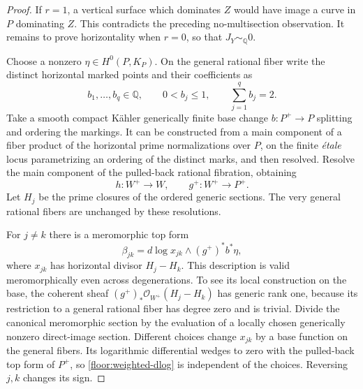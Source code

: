 \documentclass[11pt,letterpaper]{article}
\theoremstyle{definition}
\theoremstyle{remark}
\begin{document}
\begin{proof}
If $r=1$, a vertical surface which dominates $Z$ would have image
a curve in $P$ dominating $Z$.  This contradicts the preceding
no-multisection observation.  It remains to prove horizontality
when $r=0$, so that $J_Y\sim_\mathbb{Q}0$.

Choose a nonzero $\eta\in H^0(P,K_P)$.  On the general rational
fiber write the distinct horizontal marked points and their
coefficients as
\[
 b_1,\ldots,b_q\in\mathbb{Q},\qquad
 0<b_j\le1,\qquad \sum_{j=1}^q b_j=2.
\]
Take a smooth compact K\"ahler generically finite base change
$b:P^+\to P$ splitting and ordering the markings.  It can be
constructed from a main component of a fiber product of the
horizontal prime normalizations over $P$, on the finite \emph{\'etale}
locus parametrizing an ordering of the distinct marks, and then
resolved.  Resolve the main component of the pulled-back rational
fibration, obtaining
\[
 h:W^+\longrightarrow W,\qquad
 g^+:W^+\longrightarrow P^+.
\]
Let $H_j$ be the prime closures of the ordered generic sections.
The very general rational fibers are unchanged by these resolutions.

For $j\ne k$ there is a meromorphic top form
\begin{equation}
 \label{floor:weighted-dlog}
 \beta_{jk}=d\log x_{jk}\wedge(g^+)^*b^*\eta,
\end{equation}
where $x_{jk}$ has horizontal divisor $H_j-H_k$.  This description
is valid meromorphically even across degenerations.  To see its
local construction on the base, the coherent sheaf
$(g^+)_*\mathcal{O}_{W^+}(H_j-H_k)$ has generic rank one, because its
restriction to a general rational fiber has degree zero and is
trivial.  Divide the canonical meromorphic section by the
evaluation of a locally chosen generically nonzero direct-image
section.  Different choices change $x_{jk}$ by a base function on
the general fibers.  Its logarithmic differential wedges to zero
with the pulled-back top form of $P^+$, so
\eqref{floor:weighted-dlog} is independent of the choices.
Reversing $j,k$ changes its sign.


\end{proof}
\end{document}
